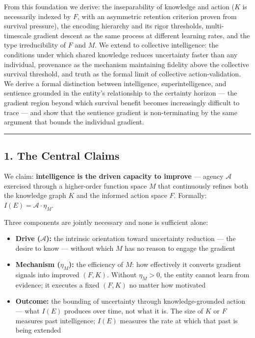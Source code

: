 \documentclass[
]{article}
\newcounter{none} %
\providecommand{\tightlist}{%
  \setlength{\itemsep}{0pt}\setlength{\parskip}{0pt}}
\begin{document}
From this foundation we derive: the inseparability of knowledge and
action (\(K\) is necessarily indexed by \(F\), with an asymmetric
retention criterion proven from survival pressure), the encoding
hierarchy and its rigor thresholds, multi-timescale gradient descent as
the same process at different learning rates, and the type
irreducibility of \(F\) and \(M\). We extend to collective intelligence:
the conditions under which shared knowledge reduces uncertainty faster
than any individual, provenance as the mechanism maintaining fidelity
above the collective survival threshold, and truth as the formal limit
of collective action-validation. We derive a formal distinction between
intelligence, superintelligence, and sentience grounded in the entity's
relationship to the certainty horizon --- the gradient region beyond
which survival benefit becomes increasingly difficult to trace --- and
show that the sentience gradient is non-terminating by the same argument
that bounds the individual gradient.

\begin{center}\rule{0.5\linewidth}{0.5pt}\end{center}

\subsection{1. The Central Claims}\label{the-central-claims}

We claim: \textbf{intelligence is the driven capacity to improve} ---
agency \(\mathcal{A}\) exercised through a higher-order function space
\(M\) that continuously refines both the knowledge graph \(K\) and the
informed action space \(F\). Formally:
\(I(E) = \mathcal{A} \cdot \eta_M\).

Three components are jointly necessary and none is sufficient alone:

\begin{itemize}
\tightlist
\item
  \textbf{Drive (\(\mathcal{A}\)):} the intrinsic orientation toward
  uncertainty reduction --- the desire to know --- without which \(M\)
  has no reason to engage the gradient
\item
  \textbf{Mechanism (\(\eta_M\)):} the efficiency of \(M\): how
  effectively it converts gradient signals into improved \((F, K)\).
  Without \(\eta_M > 0\), the entity cannot learn from evidence; it
  executes a fixed \((F, K)\) no matter how motivated
\item
  \textbf{Outcome:} the bounding of uncertainty through
  knowledge-grounded action --- what \(I(E)\) produces over time, not
  what it is. The size of \(K\) or \(F\) measures past intelligence;
  \(I(E)\) measures the rate at which that past is being extended
\end{itemize}
\end{document}
